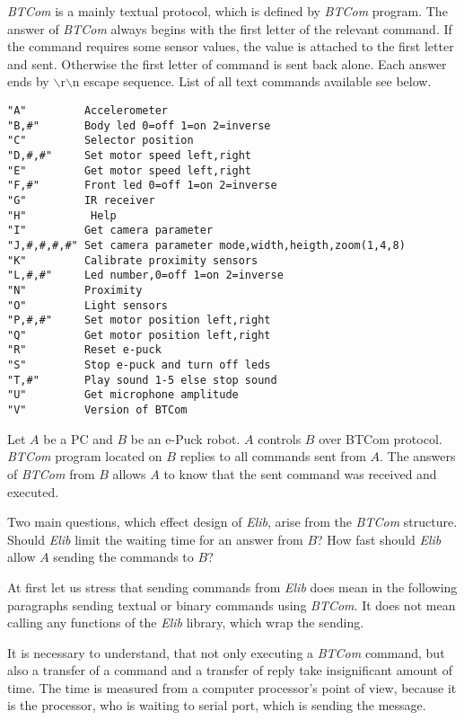 	{\it BTCom} is a mainly textual protocol, which is defined by {\it BTCom} program. The answer of {\it BTCom} always begins 
	with the first letter of the relevant command.
	If the command requires some sensor values, the value is attached to the first letter and
	sent. Otherwise the first letter of command is sent back alone. Each answer ends by 
	$\backslash$r$\backslash$n escape sequence.
	List of all text commands available see below.
	\lstset{basicstyle=\small}
\begin{lstlisting}
"A"         Accelerometer
"B,#"       Body led 0=off 1=on 2=inverse
"C"         Selector position
"D,#,#"     Set motor speed left,right
"E"         Get motor speed left,right
"F,#"       Front led 0=off 1=on 2=inverse
"G"         IR receiver
"H"          Help
"I"         Get camera parameter
"J,#,#,#,#" Set camera parameter mode,width,heigth,zoom(1,4,8)
"K"         Calibrate proximity sensors
"L,#,#"     Led number,0=off 1=on 2=inverse
"N"         Proximity
"O"         Light sensors
"P,#,#"     Set motor position left,right
"Q"         Get motor position left,right
"R"         Reset e-puck
"S"         Stop e-puck and turn off leds
"T,#"       Play sound 1-5 else stop sound
"U"         Get microphone amplitude
"V"         Version of BTCom
\end{lstlisting}
	  
	  
	Let $A$ be a PC and $B$ be an e-Puck robot. $A$ controls $B$ over BTCom protocol. {\it BTCom} program located on $B$ 
	replies to all commands sent from $A$.
	The answers of {\it BTCom} from $B$ allows $A$ to know that the sent command was received and
	executed. 
	 
	Two main questions, which effect design of {\it Elib}, arise from the {\it BTCom} structure.
	Should {\it Elib} limit the waiting time for an answer from $B$?
	How fast should {\it Elib} allow $A$ sending the commands to $B$?
	 
	At first let us stress that sending commands from {\it Elib} does mean in the following paragraphs
	sending textual or binary commands
	using {\it BTCom}. It does not mean calling any functions of the {\it Elib} library, which wrap the sending. 
	 
	It is necessary to understand, that not only executing a {\it BTCom} command, 
	but also a transfer of a command and a transfer of reply take insignificant amount of time. 
	The time is measured from a computer processor's point of view, because
	it is the processor, who is waiting to serial port, which is sending the message.
	 
